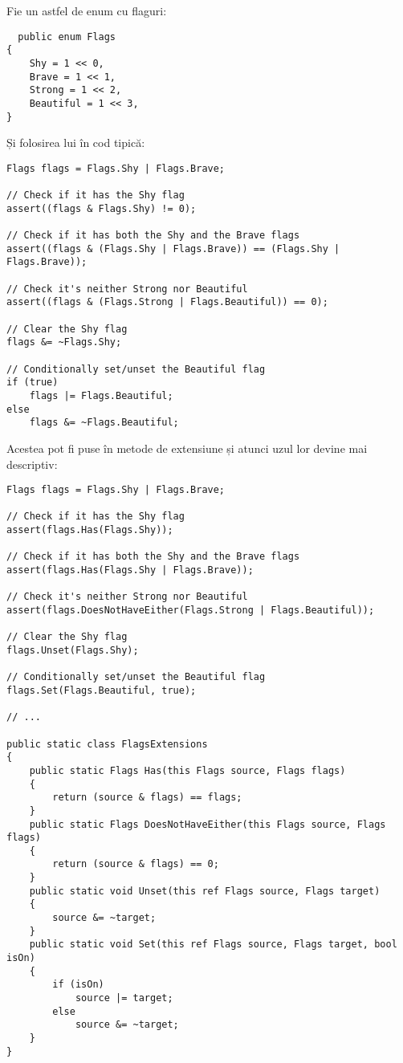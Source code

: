 \documentclass{report}
\begin{document}
Fie un astfel de enum cu flaguri:

\begin{lstlisting}
  public enum Flags
{
    Shy = 1 << 0,
    Brave = 1 << 1,
    Strong = 1 << 2,
    Beautiful = 1 << 3,
}
\end{lstlisting}

Și folosirea lui în cod tipică:

\begin{lstlisting}
Flags flags = Flags.Shy | Flags.Brave;

// Check if it has the Shy flag
assert((flags & Flags.Shy) != 0);

// Check if it has both the Shy and the Brave flags
assert((flags & (Flags.Shy | Flags.Brave)) == (Flags.Shy | Flags.Brave));

// Check it's neither Strong nor Beautiful
assert((flags & (Flags.Strong | Flags.Beautiful)) == 0);

// Clear the Shy flag
flags &= ~Flags.Shy;

// Conditionally set/unset the Beautiful flag
if (true)
    flags |= Flags.Beautiful;
else
    flags &= ~Flags.Beautiful;
\end{lstlisting}

Acestea pot fi puse în metode de extensiune și atunci uzul lor devine mai descriptiv:

\begin{lstlisting}
Flags flags = Flags.Shy | Flags.Brave;

// Check if it has the Shy flag
assert(flags.Has(Flags.Shy));

// Check if it has both the Shy and the Brave flags
assert(flags.Has(Flags.Shy | Flags.Brave));

// Check it's neither Strong nor Beautiful
assert(flags.DoesNotHaveEither(Flags.Strong | Flags.Beautiful));

// Clear the Shy flag
flags.Unset(Flags.Shy);

// Conditionally set/unset the Beautiful flag
flags.Set(Flags.Beautiful, true);

// ...

public static class FlagsExtensions
{
    public static Flags Has(this Flags source, Flags flags)
    {
        return (source & flags) == flags;
    }
    public static Flags DoesNotHaveEither(this Flags source, Flags flags)
    {
        return (source & flags) == 0;
    }
    public static void Unset(this ref Flags source, Flags target)
    {
        source &= ~target;
    }
    public static void Set(this ref Flags source, Flags target, bool isOn)
    {
        if (isOn)
            source |= target;
        else
            source &= ~target;
    }
}
\end{lstlisting}
\end{document}
